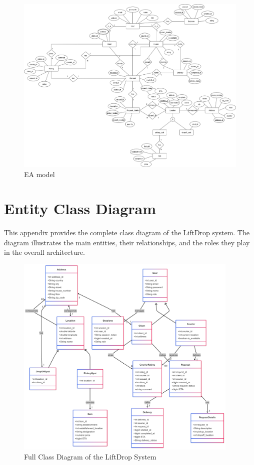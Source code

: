 \documentclass[a4paper,twoside,11pt]{article}
\begin{document}
\begin{figure}[H]
    \centering
    \includegraphics[angle=90, width=1.0\textwidth]{images/EA-model.png}
    \caption{EA model}
\end{figure}

\section{Entity Class Diagram}
\label{appendix:full-class-diagram}

This appendix provides the complete class diagram of the LiftDrop system. The diagram illustrates the main entities, their relationships, and the roles they play in the overall architecture.

\begin{figure}[H]
    \centering
    \includegraphics[width=0.95\textwidth]{images/classDiagrams/FullDiagram.png}
    \caption{Full Class Diagram of the LiftDrop System}
    \label{fig:class-diagram}
\end{figure}
\end{document}
